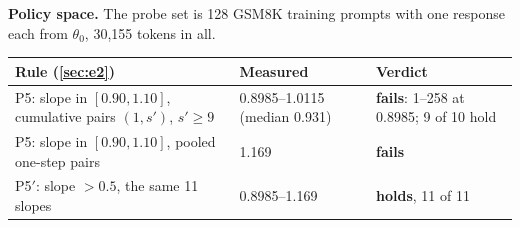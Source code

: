 \documentclass[11pt]{article}
\begin{document}
\textbf{Policy space.} The probe set is 128 GSM8K training prompts with one response each from $\theta_0$, 30{,}155 tokens in all.
\begin{center}\small
\begin{tabularx}{\linewidth}{@{}L l l@{}}
\toprule
Rule (\cref{sec:e2}) & Measured & Verdict\\
\midrule
P5: slope in $[0.90,1.10]$, cumulative pairs $(1,s')$, $s'\ge9$ & 0.8985--1.0115 (median 0.931) & \textbf{fails}: 1--258 at 0.8985; 9 of 10 hold\\
P5: slope in $[0.90,1.10]$, pooled one-step pairs & 1.169 & \textbf{fails}\\
P5$'$: slope $>0.5$, the same 11 slopes & 0.8985--1.169 & \textbf{holds}, 11 of 11\\
\bottomrule
\end{tabularx}
\end{center}
\end{document}
